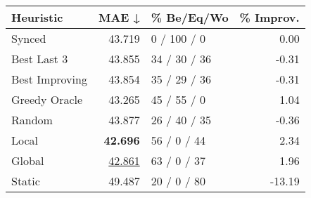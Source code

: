 \begin{tabular}{lrlr}
\toprule
\textbf{Heuristic} & \textbf{MAE ↓} & \textbf{\% Be/Eq/Wo} & \textbf{\% Improv.} \\
\midrule
            Synced &         43.719 &          0 / 100 / 0 &                0.00 \\
\midrule
       Best Last 3 &         43.855 &         34 / 30 / 36 &               -0.31 \\
    Best Improving &         43.854 &         35 / 29 / 36 &               -0.31 \\
\addlinespace
     Greedy Oracle &         43.265 &          45 / 55 / 0 &                1.04 \\
            Random &         43.877 &         26 / 40 / 35 &               -0.36 \\
\midrule
             Local &         \textbf{42.696} &          56 / 0 / 44 &                2.34 \\
            Global &         \underline{42.861} &          63 / 0 / 37 &                1.96 \\
\midrule
            Static &         49.487 &          20 / 0 / 80 &              -13.19 \\
\bottomrule
\end{tabular}

\label{tab:iid_lr05_le1_bs4_Summary}
